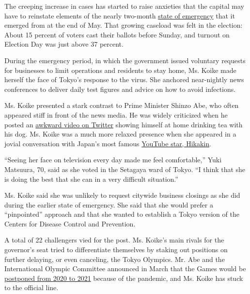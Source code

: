 The creeping increase in cases has started to raise anxieties that the
capital may have to reinstate elements of the nearly two-month
\href{https://www.nytimes3xbfgragh.onion/2020/04/19/world/asia/tokyo-japan-coronavirus.html}{state
of emergency} that it emerged from at the end of May. That growing
caseload was felt in the election: About 15 percent of voters cast their
ballots before Sunday, and turnout on Election Day was just above 37
percent.

During the emergency period, in which the government issued voluntary
requests for businesses to limit operations and residents to stay home,
Ms. Koike made herself the face of Tokyo's response to the virus. She
anchored near-nightly news conferences to deliver daily test figures and
advice on how to avoid infections.

Ms. Koike presented a stark contrast to Prime Minister Shinzo Abe, who
often appeared stiff in front of the news media. He was widely
criticized when he posted an
\href{https://twitter.com/AbeShinzo/status/1249127951154712576?ref_src=twsrc\%5Etfw\%7Ctwcamp\%5Etweetembed\%7Ctwterm\%5E1249127951154712576\%7Ctwgr\%5E\&ref_url=https\%3A\%2F\%2Fenglish.kyodonews.net\%2Fnews\%2F2020\%2F04\%2F9fe49575657a-abe-criticized-over-stay-at-home-twitter-video-showing-him-lounging.html}{awkward
video on Twitter} showing himself at home drinking tea with his dog. Ms.
Koike was a much more relaxed presence when she appeared in a jovial
conversation with Japan's most famous
\href{https://www.youtube.com/watch?v=ofCsslfc-So}{YouTube star,
Hikakin}.

``Seeing her face on television every day made me feel comfortable,''
Yuki Matsuura, 70, said as she voted in the Setagaya ward of Tokyo. ``I
think that she is doing the best that she can in a very difficult
situation.''

Ms. Koike said she was unlikely to request citywide business closings as
she did during the earlier state of emergency. She said that she would
prefer a ``pinpointed'' approach and that she wanted to establish a
Tokyo version of the Centers for Disease Control and Prevention.

A total of 22 challengers vied for the post. Ms. Koike's main rivals for
the governor's seat tried to differentiate themselves by staking out
positions on further delaying, or even canceling, the Tokyo Olympics.
Mr. Abe and the International Olympic Committee announced in March that
the Games would be
\href{https://www.nytimes3xbfgragh.onion/2020/03/24/sports/olympics/coronavirus-summer-olympics-postponed.html}{postponed
from 2020 to 2021} because of the pandemic, and Ms. Koike has stuck to
the official line.

